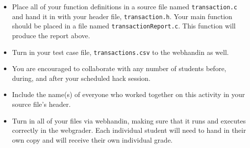 \documentclass[12pt]{scrartcl}
\begin{document}
\begin{itemize}

  \item Place all of your function definitions in a source file named 
  \texttt{transaction.c} and hand it in with your header file, 
  \texttt{transaction.h}.  Your main function should be
  placed in a file named \texttt{transactionReport.c}.  This
  function will produce the report above.

  \item Turn in your test case file, \texttt{transactions.csv}
  to the webhandin as well.

  \item You are encouraged to collaborate with any number of students 
  before, during, and after your scheduled hack session.  

  \item Include the name(s) of everyone who worked together on
  this activity in your source file's header.

  \item Turn in all of your files via webhandin, making sure that 
  it runs and executes correctly in the webgrader.  Each individual 
  student will need to hand in their own copy and will receive 
  their own individual grade.
\end{itemize}  
\end{document}
